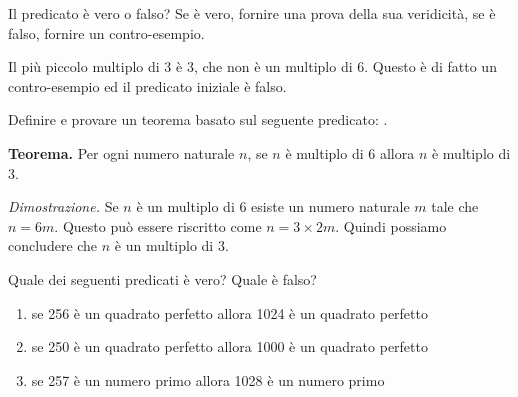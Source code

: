 \begin{esercizio}    
Il predicato  è vero o falso? Se è vero, fornire una prova della sua veridicità, se è falso, fornire un contro-esempio. 
\end{esercizio}
	
\begin{soluzione}
	Il più piccolo multiplo di 3 è 3, che non è un multiplo di 6. Questo è di fatto un contro-esempio ed il predicato iniziale è falso. \\
\end{soluzione}

\begin{esercizio}
Definire e provare un teorema basato sul seguente predicato: .
\end{esercizio}
	
\begin{soluzione}
	\textbf{Teorema.} Per ogni numero naturale $n$, se $n$ è multiplo di 6 allora $n$ è multiplo di $3$. 
    \medskip
	
	\noindent\textit{Dimostrazione.} Se $n$ è un multiplo di $6$ esiste un numero naturale $m$ tale che $n = 6m$. Questo può essere riscritto come $n = 3\times 2m$. Quindi possiamo concludere che $n$ è un multiplo di $3$. \\
\end{soluzione}

\begin{esercizio}
    
Quale dei seguenti predicati è vero? Quale è falso?
	
	\begin{enumerate}
		\item se 256 è un quadrato perfetto allora 1024 è un quadrato perfetto
		
		\item se 250 è un quadrato perfetto allora 1000 è un quadrato perfetto
		
		\item se 257 è un numero primo allora 1028 è un numero primo
	\end{enumerate}
\end{esercizio}

